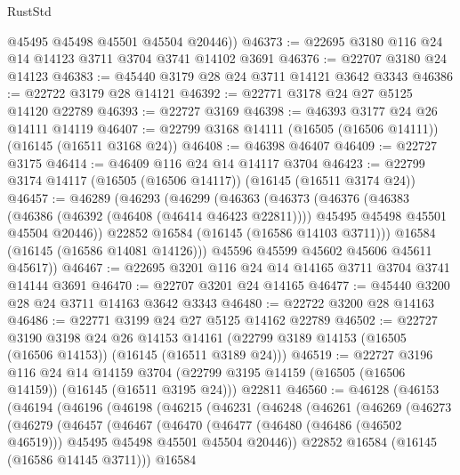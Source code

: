 \begin{lexlean}{RustStd}
\begin{coremodule}
        @45495
        @45498
        @45501
        @45504
        @20446))
@46373 := @22695 @3180 @116 @24 @14 @14123 @3711 @3704 @3741 @14102 @3691
@46376 := @22707 @3180 @24 @14123
@46383 := @45440 @3179 @28 @24 @3711 @14121 @3642 @3343
@46386 := @22722 @3179 @28 @14121
@46392 := @22771 @3178 @24 @27 @5125 @14120 @22789
@46393 := @22727 @3169
@46398 := @46393 @3177 @24 @26 @14111 @14119
@46407 := @22799 @3168 @14111 (@16505 (@16506 @14111)) (@16145 (@16511 @3168 @24))
@46408 := @46398 @46407
@46409 := @22727 @3175
@46414 := @46409 @116 @24 @14 @14117 @3704
@46423 := @22799 @3174 @14117 (@16505 (@16506 @14117)) (@16145 (@16511 @3174 @24))
@46457 := @46289
    (@46293
      (@46299
        (@46363
          (@46373
            (@46376
              (@46383
                (@46386 (@46392 (@46408 (@46414 @46423 @22811))))
                @45495
                @45498
                @45501
                @45504
                @20446))
            @22852
            @16584
            (@16145 (@16586 @14103 @3711)))
          @16584
          (@16145 (@16586 @14081 @14126)))
        @45596
        @45599
        @45602
        @45606
        @45611
        @45617))
@46467 := @22695 @3201 @116 @24 @14 @14165 @3711 @3704 @3741 @14144 @3691
@46470 := @22707 @3201 @24 @14165
@46477 := @45440 @3200 @28 @24 @3711 @14163 @3642 @3343
@46480 := @22722 @3200 @28 @14163
@46486 := @22771 @3199 @24 @27 @5125 @14162 @22789
@46502 := @22727
    @3190
    @3198
    @24
    @26
    @14153
    @14161
    (@22799 @3189 @14153 (@16505 (@16506 @14153)) (@16145 (@16511 @3189 @24)))
@46519 := @22727
    @3196
    @116
    @24
    @14
    @14159
    @3704
    (@22799 @3195 @14159 (@16505 (@16506 @14159)) (@16145 (@16511 @3195 @24)))
    @22811
@46560 := @46128
    (@46153
      (@46194
        (@46196
          (@46198
            (@46215
              (@46231
                (@46248
                  (@46261
                    (@46269
                      (@46273
                        (@46279
                          (@46457
                            (@46467
                              (@46470
                                (@46477
                                  (@46480 (@46486 (@46502 @46519)))
                                  @45495
                                  @45498
                                  @45501
                                  @45504
                                  @20446))
                              @22852
                              @16584
                              (@16145 (@16586 @14145 @3711)))
                            @16584

\end{coremodule}
\end{lexlean}
